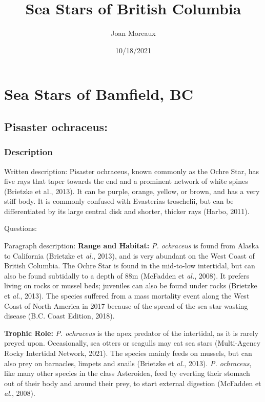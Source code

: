 \documentclass[]{article}
\title{Sea Stars of British Columbia}
\author{Joan Moreaux}
\date{10/18/2021}
\begin{document}
\maketitle

\hypertarget{sea-stars-of-bamfield-bc}{%
\section{Sea Stars of Bamfield, BC}\label{sea-stars-of-bamfield-bc}}

\hypertarget{pisaster-ochraceus}{%
\subsection{Pisaster ochraceus:}\label{pisaster-ochraceus}}

\hypertarget{description}{%
\subsubsection{Description}\label{description}}

Written description: Pisaster ochraceus, known commonly as the Ochre
Star, has five rays that taper towards the end and a prominent network
of white spines (Brietzke et al., 2013). It can be purple, orange,
yellow, or brown, and has a very stiff body. It is commonly confused
with Evasterias troschelii, but can be differentiated by its large
central disk and shorter, thicker rays (Harbo, 2011).

Questions:

Paragraph description: \textbf{Range and Habitat:} \emph{P. ochraceus}
is found from Alaska to California (Brietzke et \emph{al.}, 2013), and
is very abundant on the West Coast of British Columbia. The Ochre Star
is found in the mid-to-low intertidal, but can also be found subtidally
to a depth of 88m (McFadden et \emph{al.}, 2008). It prefers living on
rocks or mussel beds; juveniles can also be found under rocks (Brietzke
et \emph{al.}, 2013). The species suffered from a mass mortality event
along the West Coast of North America in 2017 because of the spread of
the sea star wasting disease (B.C. Coast Edition, 2018).

\textbf{Trophic Role:} \emph{P. ochraceus} is the apex predator of the
intertidal, as it is rarely preyed upon. Occasionally, sea otters or
seagulls may eat sea stars (Multi-Agency Rocky Intertidal Network,
2021). The species mainly feeds on mussels, but can also prey on
barnacles, limpets and snails (Brietzke et \emph{al.}, 2013). \emph{P.
ochraceus}, like many other species in the class Asteroidea, feed by
everting their stomach out of their body and around their prey, to start
external digestion (McFadden et \emph{al.}, 2008).
\end{document}
